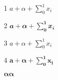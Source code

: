 \documentclass{article}
\begin{document}
1 $a+\alpha + \sum_0^1 x_i$

2 $𝒂+𝜶 + \sum_𝟎^𝟏 𝒙_𝒊$

3 {\boldmath $a+\alpha + \sum_0^1 x_i$}

4 $\bm{a+\alpha + \sum_0^1 x_i}$


$\bm{\alpha α}$
\end{document}
